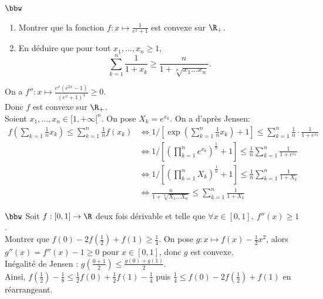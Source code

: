 \documentclass[11pt]{article}
\begin{document}
\vspace*{-0.6cm}

\begin{exercice}{$\bbw$}{}
    \begin{enumerate}
        \item Montrer que la fonction $f:x\mapsto \frac{1}{e^x+1}$ est convexe sur $\R_+$.
        \item En déduire que pour tout $x_1,...,x_n\geq1$,
        \begin{equation*}
            \sum_{k=1}^n\frac{1}{1+x_k} \geq \frac{n}{1+\sqrt[n]{x_1...x_n}}.
        \end{equation*}
    \end{enumerate}
    \tcblower
     On a $f'':x\mapsto\frac{e^x(e^{2x}-1)}{(e^x+1)^4}\geq0$.\\
    Donc $f$ est convexe sur $\R_+$.\\
     Soient $x_1,...,x_n\in[1,+\infty[^n$. On pose $X_k=e^{x_k}$. On a d'après Jensen:
    \begin{align*}
        f\left( \sum_{k=1}\frac{1}{n}x_k \right) \leq \sum_{k=1}^n\frac{1}{n}f(x_k) &\iff 1/\left[\exp\left( \sum_{k=1}^n\frac{1}{n}x_k \right)+1\right]\leq \sum_{k=1}^n\frac{1}{n}\cdot\frac{1}{1+e^{x_k}}\\
        &\iff 1/\left[\left( \prod_{k=1}^n e^{x_k} \right)^{\frac{1}{n}}+1\right]\leq\frac{1}{n}\sum_{k=1}^n\frac{1}{1+e^{x_k}}\\
        &\iff  1/\left[ \left( \prod_{k=1}^n X_k \right)^{\frac{1}{n}} +1 \right] \leq \frac{1}{n}\sum_{k=1}^n\frac{1}{1+X_k}\\
        &\iff \frac{n}{1+\sqrt[n]{X_1...X_n}} \leq \sum_{k=1}^n\frac{1}{1+X_k}
    \end{align*}
\end{exercice}

\begin{exercice}{$\bbw$}{}
    Soit $f:[0,1]\to\R$ deux fois dérivable et telle que $\forall x \in [0,1], ~ f''(x)\geq1$.\\
    Montrer que $f(0)-2f(\frac{1}{2})+f(1)\geq\frac{1}{4}$.
    \tcblower
    On pose $g:x\mapsto f(x)-\frac{1}{2}x^2$, alors $g''(x)=f''(x)-1\geq0$ pour $x\in[0,1]$, donc $g$ est convexe.\\
    Inégalité de Jensen : $g\left( \frac{0+1}{2} \right)\leq\frac{g(0)+g(1)}{2}$.\\
    Ainsi, $f(\frac{1}{2})-\frac{1}{8}\leq \frac{1}{2}f(0)+\frac{1}{2}f(1)-\frac{1}{4}$ puis $\frac{1}{4}\leq f(0) - 2f(\frac{1}{2})+ f(1)$ en réarrangeant.
\end{exercice}
\end{document}
